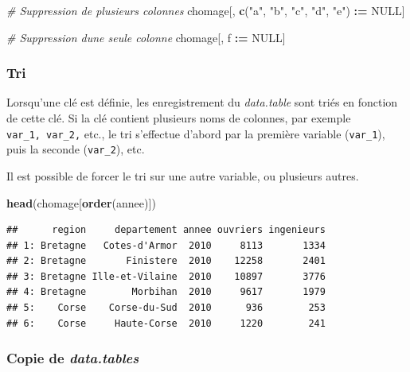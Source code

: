 \documentclass[
  11pt,
]{book}
\newenvironment{Shaded}{\begin{snugshade}}{\end{snugshade}}
\newcommand{\CommentTok}[1]{\textcolor[rgb]{0.56,0.35,0.01}{\textit{#1}}}
\newcommand{\ErrorTok}[1]{\textcolor[rgb]{0.64,0.00,0.00}{\textbf{#1}}}
\newcommand{\KeywordTok}[1]{\textcolor[rgb]{0.13,0.29,0.53}{\textbf{#1}}}
\newcommand{\NormalTok}[1]{#1}
\newcommand{\OperatorTok}[1]{\textcolor[rgb]{0.81,0.36,0.00}{\textbf{#1}}}
\newcommand{\OtherTok}[1]{\textcolor[rgb]{0.56,0.35,0.01}{#1}}
\newcommand{\StringTok}[1]{\textcolor[rgb]{0.31,0.60,0.02}{#1}}
\numberwithin{equation}{section}
\numberwithin{countremarque}{section}
\begin{document}
\begin{Shaded}
\begin{Highlighting}[]
\CommentTok{\# Suppression de plusieurs colonnes}
\NormalTok{chomage[, }\KeywordTok{c}\NormalTok{(}\StringTok{"a"}\NormalTok{, }\StringTok{"b"}\NormalTok{, }\StringTok{"c"}\NormalTok{, }\StringTok{"d"}\NormalTok{, }\StringTok{"e"}\NormalTok{) }\OperatorTok{:}\ErrorTok{=}\StringTok{ }\OtherTok{NULL}\NormalTok{]}

\CommentTok{\# Suppression d\textquotesingle{}une seule colonne}
\NormalTok{chomage[, f }\OperatorTok{:}\ErrorTok{=}\StringTok{ }\OtherTok{NULL}\NormalTok{]}
\end{Highlighting}
\end{Shaded}

\hypertarget{tri-1}{%
\subsubsection{Tri}\label{tri-1}}

Lorsqu'une clé est définie, les enregistrement du \emph{data.table} sont triés en fonction de cette clé. Si la clé contient plusieurs noms de colonnes, par exemple \texttt{var\_1,\ var\_2,} etc., le tri s'effectue d'abord par la première variable (\texttt{var\_1}), puis la seconde (\texttt{var\_2}), etc.

Il est possible de forcer le tri sur une autre variable, ou plusieurs autres.

\begin{Shaded}
\begin{Highlighting}[]
\KeywordTok{head}\NormalTok{(chomage[}\KeywordTok{order}\NormalTok{(annee)])}
\end{Highlighting}
\end{Shaded}

\begin{lstlisting}
##      region     departement annee ouvriers ingenieurs
## 1: Bretagne   Cotes-d'Armor  2010     8113       1334
## 2: Bretagne       Finistere  2010    12258       2401
## 3: Bretagne Ille-et-Vilaine  2010    10897       3776
## 4: Bretagne        Morbihan  2010     9617       1979
## 5:    Corse    Corse-du-Sud  2010      936        253
## 6:    Corse     Haute-Corse  2010     1220        241
\end{lstlisting}

\hypertarget{copie-de-data.tables}{%
\subsubsection{\texorpdfstring{Copie de \emph{data.tables}}{Copie de data.tables}}\label{copie-de-data.tables}}
\end{document}
